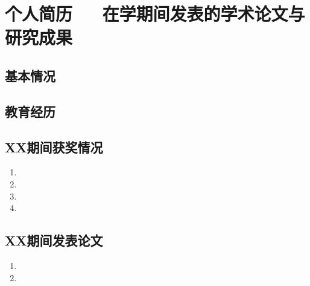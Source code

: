 

\chapter*{个人简历 $\quad$ 在学期间发表的学术论文与研究成果}
\section*{基本情况}




\section*{教育经历}



\section*{XX期间获奖情况}
\begin{enumerate}
\renewcommand{\labelenumi}{[\theenumi]}
\item 
\item 
\item 
\item 
\end{enumerate}

\section*{XX期间发表论文}
\begin{enumerate}
\renewcommand{\labelenumi}{[\theenumi]}
\item 
\item
\end{enumerate}

